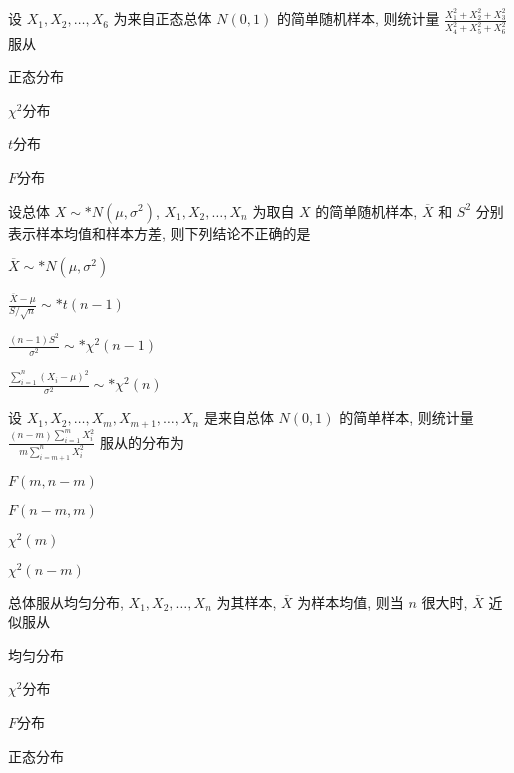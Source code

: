 \documentclass{exam-zh}
\begin{document}
\begin{question}
  设 $X_1, X_2, \dots, X_6$ 为来自正态总体 $N(0, 1)$ 的简单随机样本, 则统计量 $\frac{X_1^2 + X_2^2 + X_3^2}{X_4^2 + X_5^2 + X_6^2}$ 服从
  \paren[D]

  \begin{choices}
    \item 正态分布
    \item $\chi^2$分布
    \item $t$分布
    \item $F$分布
  \end{choices}
\end{question}

\begin{question}
  设总体 $X \sim* N(\mu, \sigma^2)$, $X_1, X_2, \dots, X_n$ 为取自 $X$ 的简单随机样本, $\overline{X}$ 和 $S^2$ 分别表示样本均值和样本方差, 则下列结论不正确的是
  \paren[A]

  \begin{choices}
    \item $\overline{X} \sim* N(\mu, \sigma^2)$
    \item $\frac{\overline{X} - \mu}{S / \sqrt{n}} \sim* t(n-1)$
    \item $\frac{(n-1)S^2}{\sigma^2} \sim* \chi^2(n-1)$
    \item $\frac{\sum_{i=1}^{n}(X_i - \mu)^2}{\sigma^2} \sim* \chi^2(n)$
  \end{choices}
\end{question}

\begin{question}
  设 $X_1, X_2, \dots, X_m, X_{m+1}, \dots, X_n$ 是来自总体 $N(0,1)$ 的简单样本, 则统计量 $\frac{(n-m)\sum_{i=1}^{m}X_i^2}{m\sum_{i=m+1}^{n}X_i^2}$ 服从的分布为
  \paren[A]

  \begin{choices}
    \item $F(m, n-m)$
    \item $F(n-m, m)$
    \item $\chi^2(m)$
    \item $\chi^2(n-m)$
  \end{choices}
\end{question}

\begin{question}
  总体服从均匀分布, $X_1, X_2, \dots, X_n$ 为其样本, $\overline{X}$ 为样本均值, 则当 $n$ 很大时, $\overline{X}$ 近似服从
  \paren[D]

  \begin{choices}
    \item 均匀分布
    \item $\chi^2$分布
    \item $F$分布
    \item 正态分布
  \end{choices}
\end{question}
\end{document}
